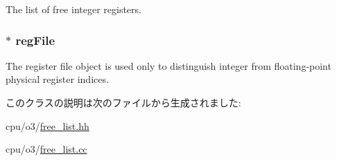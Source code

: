 \label{classUnifiedFreeList_aeafc736e9696de02d3195527f55b7470}
The list of free integer registers. \hypertarget{classUnifiedFreeList_a1cb63957414a6c5533e779b0e6e68dd7}{
\subsubsection[{regFile}]{$\ast$ {\bf regFile}}}
\label{classUnifiedFreeList_a1cb63957414a6c5533e779b0e6e68dd7}
The register file object is used only to distinguish integer from floating-\/point physical register indices. 

このクラスの説明は次のファイルから生成されました:\begin{DoxyCompactItemize}
\item 
cpu/o3/\hyperlink{free__list_8hh}{free\_\-list.hh}\item 
cpu/o3/\hyperlink{free__list_8cc}{free\_\-list.cc}\end{DoxyCompactItemize}
